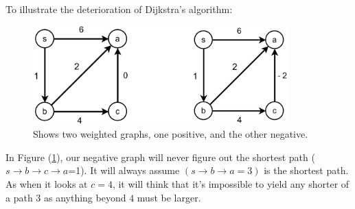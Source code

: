 \newpage

To illustrate the deterioration of Dijkstra's algorithm:

\begin{figure}[h]
    \begin{center}
      \includegraphics[height=1.5in]{./Sections/sched/dstra/dstra_neg.png}
    \end{center}
     \caption{Shows two weighted graphs, one positive, and the other negative.}\label{fig:dstra_neg}
\end{figure}

\noindent
In Figure (\ref{fig:dstra_neg}), our negative graph will never figure out the shortest path ($s\to b\to c\to a$=1). It 
will always assume $(s\to b\to a=3)$ is the shortest path. As when it looks at $c=4$, it will think that it's 
impossible to yield any shorter of a path $3$ as anything beyond $4$ must be larger.